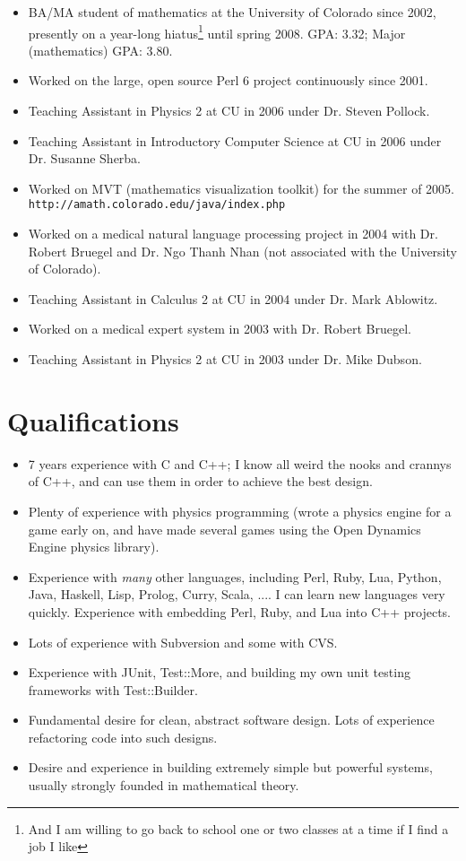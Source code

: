 \documentclass[12pt]{article}
\begin{document}
\begin{itemize}
\item BA/MA student of mathematics at the University of Colorado since
2002, presently on a year-long hiatus\footnote{And I am willing to go
back to school one or two classes at a time if I find a job I like}
until spring 2008.  GPA: 3.32; Major (mathematics) GPA: 3.80.  \item
Worked on the large, open source Perl 6 project continuously since
2001.
\item Teaching Assistant in Physics 2 at CU in 2006 under Dr. Steven
Pollock.
\item Teaching Assistant in Introductory Computer Science at CU in 2006
under Dr. Susanne Sherba.
\item Worked on MVT (mathematics visualization toolkit) for the summer
of 2005. \verb|http://amath.colorado.edu/java/index.php|
\item Worked on a medical natural language processing project in 2004 with
Dr. Robert Bruegel and Dr. Ngo Thanh Nhan (not associated with the
University of Colorado).
\item Teaching Assistant in Calculus 2 at CU in 2004 under Dr. Mark
Ablowitz.
\item Worked on a medical expert system in 2003 with Dr. Robert Bruegel.
\item Teaching Assistant in Physics 2 at CU in 2003 under Dr. Mike
Dubson.
\end{itemize}

\section*{Qualifications}

\begin{itemize}
\item 7 years experience with C and C++; I know all weird the nooks and
crannys of C++, and can use them in order to achieve the best design.
\item Plenty of experience with physics programming (wrote a physics
engine for a game early on, and have made several games using the Open
Dynamics Engine physics library).
\item Experience with \textit{many} other languages, including Perl,
Ruby, Lua, Python, Java, Haskell, Lisp, Prolog, Curry, Scala, ....  I
can learn new languages very quickly.  Experience with embedding Perl,
Ruby, and Lua into C++ projects. 
\item Lots of experience with Subversion and some with CVS.
\item Experience with JUnit, Test::More, and building my own unit
testing frameworks with Test::Builder.
\item Fundamental desire for clean, abstract software design.  Lots of
experience refactoring code into such designs.
\item Desire and experience in building extremely simple but powerful
systems, usually strongly founded in mathematical theory.
\end{itemize}
\end{document}
